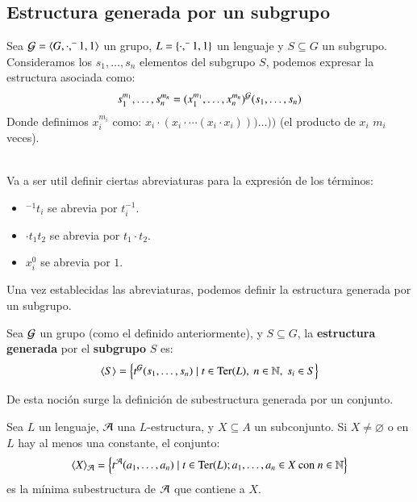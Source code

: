 \subsection{Estructura generada por un subgrupo}

Sea $\mathcal{G} = \langle G, \cdot, ^-1, 1\rangle$ un grupo, $L = \left\{\cdot, ^-1, 1\right\}$ un lenguaje y $S \subseteq G$ un subgrupo. Consideramos los $s_1, \ldots, s_n$ elementos del subgrupo $S$, podemos expresar la estructura asociada como:
$$
    s_1^{m_1}, \ldots, s_n^{m_n} = (x_1^{m_1}, \ldots, x_n^{m_n})^{\mathcal{G}} (s_1, \ldots, s_n)
$$
Donde definimos $x_i^{m_i}$ como: $x_i \cdot (x_i \cdot \cdots (x_i \cdot x_i)))\ldots))$ (el producto de $x_i$ $m_i$ veces).\\\\

\begin{obs}
    Va a ser util definir ciertas abreviaturas para la expresión de los términos:
    \begin{itemize}
        \item $^{-1} t_i$ se abrevia por $t_i^{-1}$.
        \item $\cdot t_1 t_2$ se abrevia por $t_1 \cdot t_2$.
        \item $x_i^0$ se abrevia por $1$.
    \end{itemize}

\end{obs}

Una vez establecidas las abreviaturas, podemos definir la estructura generada por un subgrupo.

\begin{dfn}
    Sea $\mathcal{G}$ un grupo (como el definido anteriormente), y $S \subseteq G$, la \textbf{estructura generada} por el \textbf{subgrupo} $S$ es:
    $$
        \langle S\rangle = \left\{t^{\mathcal{G}}(s_1, \ldots, s_n) \mid t \in \mathrm{Ter}(L),\ n \in \mathbb{N},\ s_i \in S\right\}
    $$
\end{dfn}

De esta noción surge la definición de subestructura generada por un conjunto.

\begin{pro}
    Sea $L$ un lenguaje, $\mathcal{A}$ una $L$-estructura, y $X \subseteq A$ un subconjunto. Si $X \neq \varnothing$ o en $L$ hay al menos una constante, el conjunto:
    $$
        \langle X\rangle_{\mathcal{A}} = \left\{t^{\mathcal{A}} (a_1,\ldots, a_n) \mid t\in \mathrm{Ter}(L); a_1,\ldots,a_n \in X \text{ con } n\in\mathbb{N}\right\}
    $$
    es la mínima subestructura de $\mathcal{A}$ que contiene a $X$.
\end{pro}

